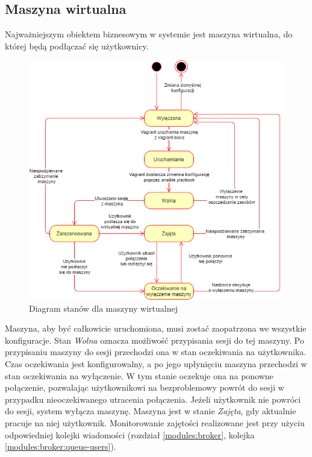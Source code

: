 \documentclass[../opis-rozwiazania.tex]{subfiles}
\begin{document}
\label{state_diagrams}

\subsection{Maszyna wirtualna}
Najważniejszym obiektem biznesowym w systemie jest maszyna wirtualna, do której będą podłączać się użytkownicy.

\begin{figure}[H]
  \centering
  \includegraphics[width=\textwidth]{../diagrams/state_diagrams/virtual_machine.png}
  \caption{Diagram stanów dla maszyny wirtualnej}
  \label{state_vm}
\end{figure}

Maszyna, aby być całkowicie uruchomiona, musi zostać zaopatrzona we wszystkie konfiguracje.
Stan \textit{Wolna} oznacza możliwość przypisania sesji do tej maszyny.
Po przypisaniu maszyny do sesji przechodzi ona w stan oczekiwania na użytkownika. Czas oczekiwania jest konfigurowalny, a po jego upłynięciu maszyna przechodzi w stan oczekiwania na wyłączenie.
W tym stanie oczekuje ona na ponowne połączenie, pozwalając użytkownikowi na bezproblemowy powrót do sesji w przypadku nieoczekiwanego utracenia połączenia. Jeżeli użytkownik nie powróci do sesji, system wyłącza maszynę.
Maszyna jest w stanie \textit{Zajęta}, gdy aktualnie pracuje na niej użytkownik. Monitorowanie zajętości realizowane jest przy użyciu odpowiedniej kolejki wiadomości (rozdział \ref{modules:broker}, kolejka \ref{modules:broker:queue-users}).
\end{document}
